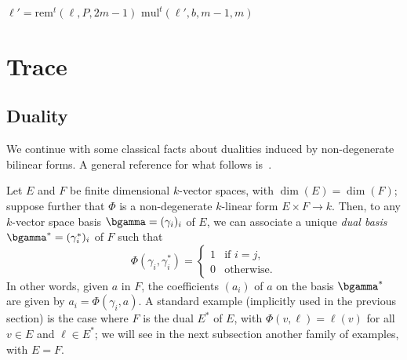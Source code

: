 \documentclass{sig-alternate}
\def\mul {\ensuremath{\mathrm{mul}}}
\def\rem {\ensuremath{\mathrm{rem}}}
\def\mulmod {\ensuremath{\mathrm{mulmod}}}
\newcommand{\ang}[1]{\langle#1\rangle}
\begin{document}

\begin{algorithm}[H]
  \caption{$\mulmod^t(\ell,b,P)$}
  \begin{algorithmic}[1]
    \STATE $\ell' = \rem^t(\ell,P,2m-1)$
    \RETURN $\mul^t(\ell', b, m-1, m)$
  \end{algorithmic}
\end{algorithm}


\section{Trace}


\subsection{Duality}\label{ssec:duality}

We continue with some classical facts about dualities induced by
non-degenerate bilinear forms. A general reference for what follows
is~\cite[Ch.~IX.1.8]{BourbakiAlgCom9}.

Let $E$ and $F$ be finite dimensional $k$-vector spaces, with
$\dim(E)=\dim(F)$; suppose further that $\Phi$ is a non-degenerate
$k$-linear form $E\times F \to k$. Then, to any $k$-vector space basis
$\bgamma=(\gamma_i)_i$ of $E$, we can associate a unique \emph{dual basis}
$\bgamma^\ast=(\gamma_i^\ast)_i$ of $F$ such that
\begin{equation}
  \label{eq:dual-basis}
  \Phi(\gamma_i,\gamma^\ast_i) = \begin{cases} 1 &\text{if $i=j$,}\\ 0
    &\text{otherwise}.
  \end{cases}
\end{equation}
In other words, given $a$ in $F$, the coefficients $(a_i)$ of $a$ on
the basis $\bgamma^\ast$ are given by $a_i=\Phi(\gamma_i, a)$. A
standard example (implicitly used in the previous section) is the case
where $F$ is the dual $E^*$ of $E$, with $\Phi(v,\ell)=\ell(v)$ for
all $v\in E$ and $\ell \in E^*$; we will see in the next subsection
another family of examples, with $E=F$.
\end{document}
